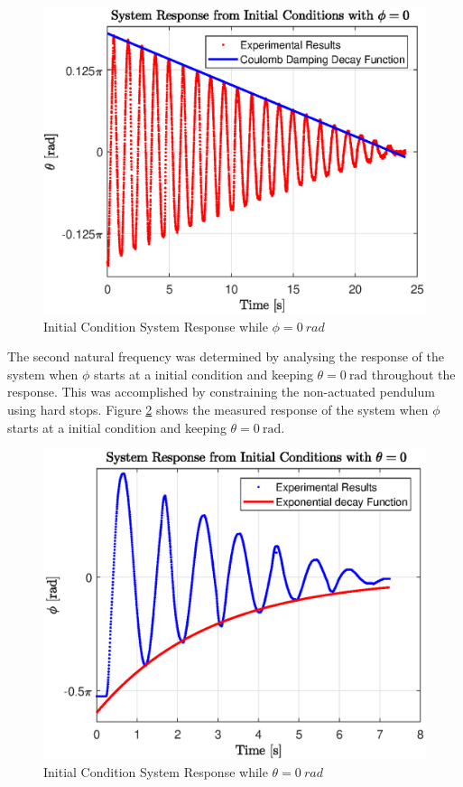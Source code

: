 \begin{figure}[h]
	\centering
	\includegraphics[scale=1]{./figs/q1_initial_response.eps}
	\caption{Initial Condition System Response while $ \phi = \SI{0}{rad} $ }
	\label{fig:q1_response}
\end{figure}


The second natural frequency was determined by analysing the response of the system when $\phi$ starts at a initial condition and keeping $\theta = \SI{0}{\radian}$ throughout the response. This was accomplished by constraining the non-actuated pendulum using hard stops. Figure \ref{fig:q2_response} shows the measured response of the system when $\phi$ starts at a initial condition and keeping $\theta = \SI{0}{\radian} $.\\

\begin{figure}[h]
	\centering
	\includegraphics[scale=1]{./figs/q2_initial_response.eps}
	\caption{Initial Condition System Response while $ \theta = \SI{0}{rad} $ }
	\label{fig:q2_response}
\end{figure}

